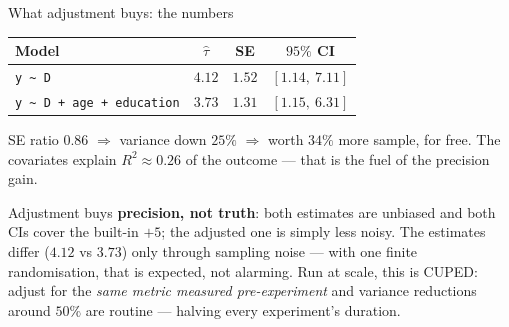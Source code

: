 \documentclass[aspectratio=169,11pt]{beamer}
\begin{document}
\begin{frame}{What adjustment buys: the numbers}
  \scriptsize
  \begin{numexample}
    \begin{center}
    \begin{tabular}{@{}lccc@{}}
      \toprule
      Model & $\hat\tau$ & SE & $95\%$ CI \\
      \midrule
      \texttt{y \~{} D}                     & $4.12$ & $1.52$ & $[1.14,\ 7.11]$ \\
      \texttt{y \~{} D + age + education}   & $3.73$ & $1.31$ & $[1.15,\ 6.31]$ \\
      \bottomrule
    \end{tabular}
    \end{center}
    SE ratio $0.86$ $\Rightarrow$ variance down $25\%$ $\Rightarrow$ worth $34\%$ more
    sample, for free. The covariates explain $R^2 \approx 0.26$ of the outcome ---
    that is the fuel of the precision gain.
  \end{numexample}
  \begin{takeaway}
    Adjustment buys \textbf{precision, not truth}: both estimates are unbiased and both
    CIs cover the built-in $+5$; the adjusted one is simply less noisy. The estimates
    differ ($4.12$ vs $3.73$) only through sampling noise --- with one finite
    randomisation, that is expected, not alarming. Run at scale, this is CUPED: adjust for
    the \emph{same metric measured pre-experiment} and variance reductions around $50\%$
    are routine --- halving every experiment's duration.
  \end{takeaway}
\end{frame}
\end{document}
